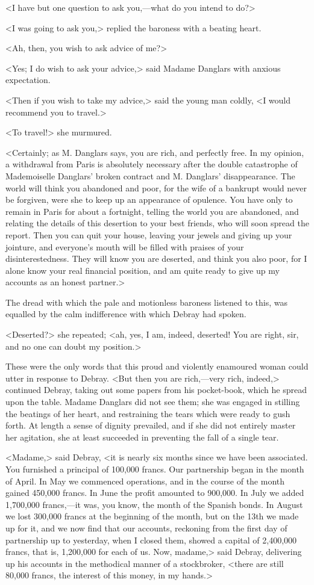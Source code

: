  <I have but one question to ask you,—what do you intend to do?> 

 <I was going to ask you,> replied the baroness with a beating heart. 

 <Ah, then, you wish to ask advice of me?> 

 <Yes; I do wish to ask your advice,> said Madame Danglars with anxious expectation. 

 <Then if you wish to take my advice,> said the young man coldly, <I would recommend you to travel.> 

 <To travel!> she murmured. 

 <Certainly; as M. Danglars says, you are rich, and perfectly free. In my opinion, a withdrawal from Paris is absolutely necessary after the double catastrophe of Mademoiselle Danglars' broken contract and M. Danglars' disappearance. The world will think you abandoned and poor, for the wife of a bankrupt would never be forgiven, were she to keep up an appearance of opulence. You have only to remain in Paris for about a fortnight, telling the world you are abandoned, and relating the details of this desertion to your best friends, who will soon spread the report. Then you can quit your house, leaving your jewels and giving up your jointure, and everyone's mouth will be filled with praises of your disinterestedness. They will know you are deserted, and think you also poor, for I alone know your real financial position, and am quite ready to give up my accounts as an honest partner.> 

 The dread with which the pale and motionless baroness listened to this, was equalled by the calm indifference with which Debray had spoken. 

 <Deserted?> she repeated; <ah, yes, I am, indeed, deserted! You are right, sir, and no one can doubt my position.> 

 These were the only words that this proud and violently enamoured woman could utter in response to Debray.  <But then you are rich,—very rich, indeed,> continued Debray, taking out some papers from his pocket-book, which he spread upon the table. Madame Danglars did not see them; she was engaged in stilling the beatings of her heart, and restraining the tears which were ready to gush forth. At length a sense of dignity prevailed, and if she did not entirely master her agitation, she at least succeeded in preventing the fall of a single tear. 

 <Madame,> said Debray, <it is nearly six months since we have been associated. You furnished a principal of 100,000 francs. Our partnership began in the month of April. In May we commenced operations, and in the course of the month gained 450,000 francs. In June the profit amounted to 900,000. In July we added 1,700,000 francs,—it was, you know, the month of the Spanish bonds. In August we lost 300,000 francs at the beginning of the month, but on the 13th we made up for it, and we now find that our accounts, reckoning from the first day of partnership up to yesterday, when I closed them, showed a capital of 2,400,000 francs, that is, 1,200,000 for each of us. Now, madame,> said Debray, delivering up his accounts in the methodical manner of a stockbroker, <there are still 80,000 francs, the interest of this money, in my hands.> 

